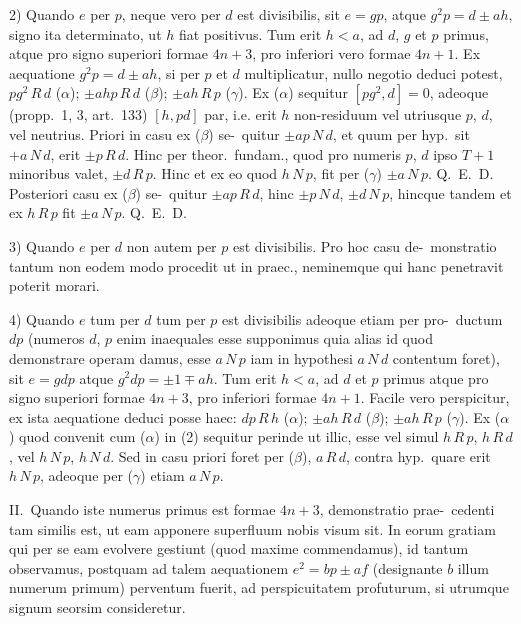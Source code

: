 \documentclass[12pt,a4paper]{article}
\theoremstyle{plain}
\theoremstyle{definition}
\theoremstyle{remark}
\begin{document}
2) Quando $e$ per $p$, neque vero per $d$ est divisibilis, sit $e = gp$, atque
$g^2p = d \pm ah$, signo ita determinato, ut $h$ fiat positivus. Tum erit $h < a$, ad
$d$, $g$ et $p$ primus, atque pro signo superiori formae $4n+3$, pro inferiori vero
formae $4n+1$. Ex aequatione $g^2p = d \pm ah$, si per $p$ et $d$ multiplicatur,
nullo negotio deduci potest, $pg^2 \, R \, d$ ($\alpha$); $\pm ahp \, R \, d$ ($\beta$); $\pm ah \, R \, p$ ($\gamma$).
Ex ($\alpha$) sequitur $[pg^2, d] = 0$, adeoque (propp.~1, 3, art.~133) $[h, pd]$ par, i.e.
erit $h$ non-residuum vel utriusque $p$, $d$, vel neutrius. Priori in casu ex ($\beta$) se-\ quitur $\pm ap \, N \, d$, et quum per hyp.\ sit $+a \, N \, d$, erit $\pm p \, R \, d$. Hinc per theor.\ fundam., quod pro numeris $p$, $d$ ipso $T+1$ minoribus valet, $\pm d \, R \, p$. Hinc
et ex eo quod $h \, N \, p$, fit per ($\gamma$) $\pm a \, N \, p$. Q.~E.~D. Posteriori casu ex ($\beta$) se-\ quitur $\pm ap \, R \, d$, hinc $\pm p \, N \, d$, $\pm d \, N \, p$, hincque tandem et ex $h \, R \, p$ fit
$\pm a \, N \, p$. Q.~E.~D.

3) Quando $e$ per $d$ non autem per $p$ est divisibilis. Pro hoc casu de-\ monstratio tantum non eodem modo procedit ut in praec., neminemque qui hanc
penetravit poterit morari.

4) Quando $e$ tum per $d$ tum per $p$ est divisibilis adeoque etiam per pro-\ ductum $dp$ (numeros $d$, $p$ enim inaequales esse supponimus quia alias id quod
demonstrare operam damus, esse $a \, N \, p$ iam in hypothesi $a \, N \, d$ contentum foret),
sit $e = gdp$ atque $g^2dp = \pm 1 \mp ah$. Tum erit $h < a$, ad $d$ et $p$ primus atque
pro signo superiori formae $4n+3$, pro inferiori formae $4n+1$. Facile vero
perspicitur, ex ista aequatione deduci posse haec: $dp \, R \, h$ ($\alpha$); $\pm ah \, R \, d$ ($\beta$);
$\pm ah \, R \, p$ ($\gamma$). Ex ($\alpha$) quod convenit cum ($\alpha$) in (2) sequitur perinde ut illic,
esse vel simul $h \, R \, p$, $h \, R \, d$, vel $h \, N \, p$, $h \, N \, d$. Sed in casu priori foret per
($\beta$), $a \, R \, d$, contra hyp.\ quare erit $h \, N \, p$, adeoque per ($\gamma$) etiam $a \, N \, p$.

II.\ Quando iste numerus primus est formae $4n+3$, demonstratio prae-\ cedenti tam similis est, ut eam apponere superfluum nobis visum sit. In eorum
gratiam qui per se eam evolvere gestiunt (quod maxime commendamus), id tantum
observamus, postquam ad talem aequationem $e^2 = bp \pm af$ (designante $b$ illum
numerum primum) perventum fuerit, ad perspicuitatem profuturum, si utrumque
signum seorsim consideretur.
\end{document}

